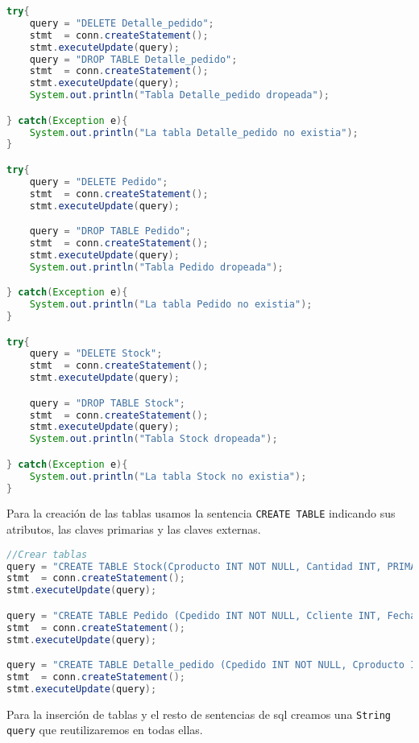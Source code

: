\begin{lstlisting}[language=Java]
try{
	query = "DELETE Detalle_pedido";
	stmt  = conn.createStatement();
	stmt.executeUpdate(query);
	query = "DROP TABLE Detalle_pedido";
	stmt  = conn.createStatement();
	stmt.executeUpdate(query);
	System.out.println("Tabla Detalle_pedido dropeada");

} catch(Exception e){
	System.out.println("La tabla Detalle_pedido no existia");
}

try{
	query = "DELETE Pedido";
	stmt  = conn.createStatement();
	stmt.executeUpdate(query);

	query = "DROP TABLE Pedido";
	stmt  = conn.createStatement();
	stmt.executeUpdate(query);
	System.out.println("Tabla Pedido dropeada");

} catch(Exception e){
	System.out.println("La tabla Pedido no existia");
}

try{
	query = "DELETE Stock";
	stmt  = conn.createStatement();
	stmt.executeUpdate(query);

	query = "DROP TABLE Stock";
	stmt  = conn.createStatement();
	stmt.executeUpdate(query);
	System.out.println("Tabla Stock dropeada");

} catch(Exception e){
	System.out.println("La tabla Stock no existia");
}
\end{lstlisting}

Para la creación de las tablas usamos la sentencia \texttt{CREATE TABLE} indicando sus atributos, las claves primarias y las claves externas.

\begin{lstlisting}[language=Java]
//Crear tablas
query = "CREATE TABLE Stock(Cproducto INT NOT NULL, Cantidad INT, PRIMARY KEY (Cproducto))";
stmt  = conn.createStatement();
stmt.executeUpdate(query);

query = "CREATE TABLE Pedido (Cpedido INT NOT NULL, Ccliente INT, Fecha_pedido DATE, PRIMARY KEY (Cpedido))";
stmt  = conn.createStatement();
stmt.executeUpdate(query);

query = "CREATE TABLE Detalle_pedido (Cpedido INT NOT NULL, Cproducto INT NOT NULL, Cantidad int,FOREIGN KEY(Cpedido) REFERENCES Pedido(Cpedido),FOREIGN KEY(Cproducto) REFERENCES Stock(Cproducto),PRIMARY KEY(Cpedido,Cproducto))";
stmt  = conn.createStatement();
stmt.executeUpdate(query);
\end{lstlisting}

Para la inserción de tablas y el resto de sentencias de sql creamos una \texttt{String query} que reutilizaremos en todas ellas.

